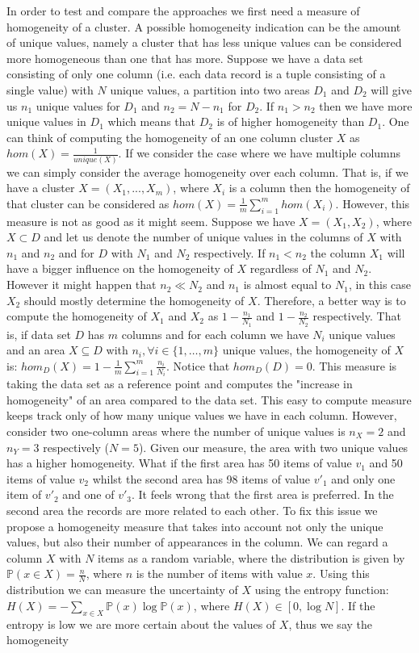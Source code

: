 In order to test and compare the approaches we first need a measure of homogeneity of a cluster. A possible homogeneity indication can be the amount of unique values, namely a cluster that has less unique values can be considered more homogeneous than one that has more. Suppose we have a data set consisting of only one column (i.e. each data record is a tuple consisting of a single value) with $N$ unique values, a partition into two areas $D_1$ and $D_2$ will give us $n_1$ unique values for $D_1$ and $n_2 = N - n_1$ for $D_2$. If $n_1 > n_2$ then we have more unique values in $D_1$ which means that $D_2$ is of higher homogeneity than $D_1$. One can think of computing the homogeneity of an one column cluster $X$ as $hom(X) = \frac{1}{unique(X)}$. If we consider the case where we have multiple columns we can simply consider the average homogeneity over each column. That is, if we have a cluster $X = (X_1, ..., X_m)$, where $X_i$ is a column then the homogeneity of that cluster can be considered as $hom(X) = \frac{1}{m} \sum_{i = 1}^m hom(X_i)$. However, this measure is not as good as it might seem. Suppose we have $X = (X_1, X_2)$, where $X \subset D$ and let us denote the number of unique values in the columns of $X$ with $n_1$ and $n_2$ and for $D$ with $N_1$ and $N_2$ respectively. If $n_1 < n_2$ the column $X_1$ will have a bigger influence on the homogeneity of $X$ regardless of $N_1$ and $N_2$. However it might happen that $n_2 \ll N_2$ and $n_1$ is almost equal to  $N_1$, in this case $X_2$ should mostly determine the homogeneity of $X$. Therefore, a better way is to compute the homogeneity of $X_1$ and $X_2$ as $1 - \frac{n_1}{N_1}$ and $1 - \frac{n_2}{N_2}$ respectively. That is, if data set $D$ has $m$ columns and for each column we have $N_i$ unique values and an area $X \subseteq D$ with $n_i, \forall i \in \{1, \dots, m\}$ unique values, the homogeneity of $X$ is: $hom_D(X) = 1 - \frac{1}{m}\sum_{i = 1}^m \frac{n_i}{N_i}$. Notice that $hom_D(D) = 0$. This measure is taking the data set as a reference point and computes the "increase in homogeneity" of an area compared to the data set. This easy to compute measure keeps track only of how many unique values we have in each column. However, consider two one-column areas where the number of unique values is $n_X = 2$ and $n_Y = 3$ respectively ($N = 5$). Given our measure, the area with two unique values has a higher homogeneity. What if the first area has 50 items of value $v_1$ and 50 items of value $v_2$ whilst the second area has 98 items of value $v'_1$ and only one item of $v'_2$ and one of $v'_3$. It feels wrong that the first area is preferred. In the second area the records are more related to each other. To fix this issue we propose a homogeneity measure that takes into account not only the unique values, but also their number of appearances in the column. We can regard a column $X$ with $N$ items as a random variable, where the distribution is given by $\mathbb{P}(x \in X) = \frac{n}{N}$, where $n$ is the number of items with value $x$. Using this distribution we can measure the uncertainty of $X$ using the entropy function: $H(X) =  - \sum_{x \in X} \mathbb{P}(x) \log \mathbb{P}(x)$, where $H(X) \in [0, \log N]$. If the entropy is low we are more certain about the values of $X$, thus we say the homogeneity 